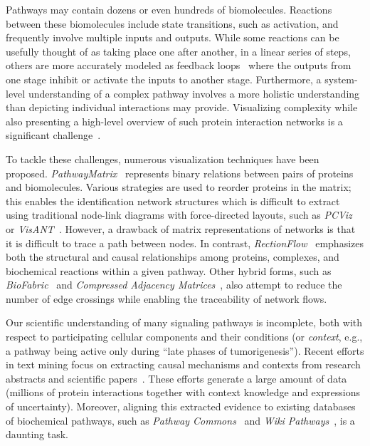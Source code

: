 \documentclass[journal]{vgtc}                %
\begin{document}
Pathways may contain dozens or even hundreds of biomolecules. Reactions between these biomolecules include state transitions, such as activation, and frequently involve multiple inputs and outputs.  While some reactions can be usefully thought of as taking place one after another, in a linear series of steps, others are more accurately modeled as feedback loops~\cite{biovisDang2} where the outputs from one stage inhibit or activate the inputs to another stage. Furthermore, a system-level understanding of a complex pathway involves a more holistic understanding than depicting individual interactions may provide. Visualizing complexity while also presenting a high-level overview of such protein interaction networks is a significant challenge~\cite{saraiya2005visualizing}.

To tackle these challenges, numerous visualization techniques have been proposed. \textit{PathwayMatrix}~\cite{biovisDang1} represents binary relations between pairs of proteins and biomolecules. Various strategies are used to reorder proteins in the matrix; this enables the identification network structures which is difficult to extract using traditional node-link diagrams
with force-directed layouts, such as \textit{PCViz}~\cite{cerami2011pathway} or \textit{VisANT}~\cite{hu2009visant}. However, a drawback of matrix representations of networks is that it is difficult to trace a path between nodes. In contrast, \textit{RectionFlow}~\cite{biovisDang2} emphasizes both the structural and causal relationships among proteins, complexes, and biochemical reactions within a given pathway. Other hybrid forms, such as \textit{BioFabric}~\cite{longabaugh2012combing} and \textit{Compressed Adjacency Matrices}~\cite{dinkla2012compressed}, also attempt to reduce the number of edge crossings while enabling the traceability of network flows. 

Our scientific understanding of many signaling pathways is incomplete, both with respect to participating cellular components and their conditions (or \textit{context}, e.g., a pathway being active only during ``late phases of tumorigenesis''). Recent efforts in text mining focus on extracting causal mechanisms and contexts from research abstracts and scientific
papers~\cite{Valenzuela2015DBLP,Valenzuela:15,Valenzuela:16}. 
These efforts generate a large amount of data (millions of protein interactions together with context knowledge and expressions of uncertainty). Moreover, aligning this extracted evidence to existing databases of biochemical pathways, such as \textit{Pathway Commons}~\cite{PathwayCommons2011} and \textit{Wiki Pathways}~\cite{Kutmon2016WikiPathways}, is a daunting task. 
\end{document}
